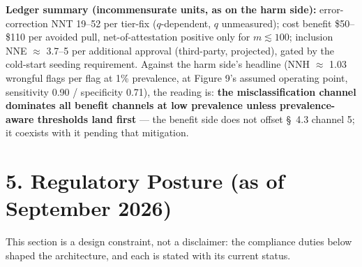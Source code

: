 \documentclass[11pt,twocolumn]{article}
\begin{document}
\textbf{Ledger summary (incommensurate units, as on the harm side):} error-correction NNT 19--52 per tier-fix ($q$-dependent, $q$ unmeasured); cost benefit \$50--\$110 per avoided pull, net-of-attestation positive only for $m \lesssim 100$; inclusion NNE $\approx$ 3.7--5 per additional approval (third-party, projected), gated by the cold-start seeding requirement. Against the harm side's headline (NNH $\approx$ 1.03 wrongful flags per flag at 1\% prevalence, at Figure 9's assumed operating point, sensitivity 0.90 / specificity 0.71), the reading is: \textbf{the misclassification channel dominates all benefit channels at low prevalence unless prevalence-aware thresholds land first} --- the benefit side does not offset \S~4.3 channel 5; it coexists with it pending that mitigation.

\section*{5. Regulatory Posture (as of September 2026)}

This section is a design constraint, not a disclaimer: the compliance duties below shaped the architecture, and each is stated with its current status.
\end{document}

